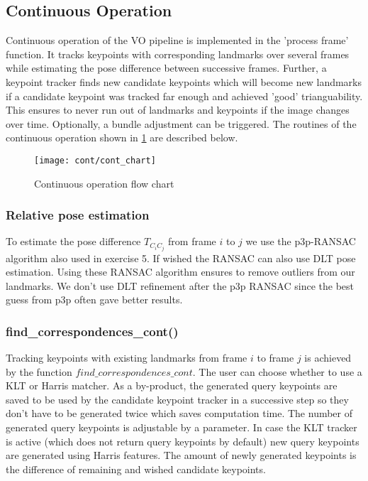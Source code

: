 \subsection{Continuous Operation}
\label{sec_cont_op}
Continuous operation of the VO pipeline is implemented in the 'process frame' function. It tracks keypoints with corresponding landmarks over several frames while estimating the pose difference between successive frames. Further, a keypoint tracker finds new candidate keypoints which will become new landmarks if a candidate keypoint was tracked far enough and achieved 'good' trianguability. This ensures to never run out of landmarks and keypoints if the image changes over time. Optionally, a bundle adjustment can be triggered. The routines of the continuous operation shown in \cref{img_flow_cont} are described below.

\begin{figure}[ht]
	\centering
	\texttt{[image: cont/cont\_chart]}
	\caption{Continuous operation flow chart}
	\label{img_flow_cont}
\end{figure}

\subsubsection{Relative pose estimation}
\label{ransac_cont}
To estimate the pose difference $T_{C_iC_j}$ from frame $i$ to $j$ we use the p3p-RANSAC algorithm also used in exercise 5. If wished the RANSAC can also use DLT pose estimation. Using these RANSAC algorithm ensures to remove outliers from our landmarks. We don't use DLT refinement after the p3p RANSAC since the best guess from p3p often gave better results.

\subsubsection{find\_correspondences\_cont()}
Tracking keypoints with existing landmarks from frame $i$ to frame $j$ is achieved by the function $find\_correspondences\_cont$. The user can choose whether to use a KLT or Harris matcher. As a by-product, the generated query keypoints are saved to be used by the candidate keypoint tracker in a successive step so they don't have to be generated twice which saves computation time. The number of generated query keypoints is adjustable by a parameter. In case the KLT tracker is active (which does not return query keypoints by default) new query keypoints are generated using Harris features. The amount of newly generated keypoints is the difference of remaining and wished candidate keypoints.

